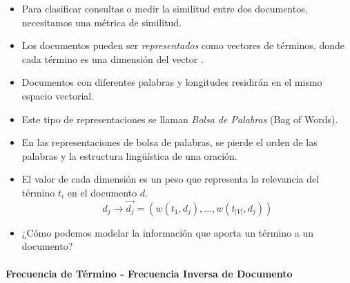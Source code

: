 \begin{itemize}
\item Para clasificar consultas o medir la similitud entre dos documentos, necesitamos una métrica de similitud.
\item Los documentos pueden ser \textit{representados} como vectores de términos, donde cada término es una dimensión del vector \cite{salton1975vector}.
\item Documentos con diferentes palabras y longitudes residirán en el mismo espacio vectorial.
\item Este tipo de representaciones se llaman \emph{Bolsa de Palabras} (Bag of Words).
\item En las representaciones de bolsa de palabras, se pierde el orden de las palabras y la estructura lingüística de una oración.
\item El valor de cada dimensión es un peso que representa la relevancia del término $t_{i}$ en el documento $d$.
\begin{equation}
d_{j} \rightarrow \overrightarrow{d_{j}}=(w(t_{1},d_{j}),...,w(t_{|V|},d_{j}))
\end{equation}
\item ¿Cómo podemos modelar la información que aporta un término a un documento?
\end{itemize}

\paragraph{Frecuencia de Término - Frecuencia Inversa de Documento}


